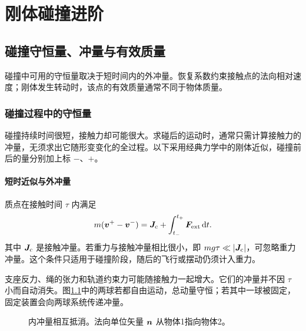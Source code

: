\chapter{刚体碰撞进阶}



\section{碰撞守恒量、冲量与有效质量}

碰撞中可用的守恒量取决于短时间内的外冲量。恢复系数约束接触点的法向相对速度；刚体发生转动时，该点的有效质量通常不同于物体质量。



\subsection{碰撞过程中的守恒量}
碰撞持续时间很短，接触力却可能很大。求碰后的运动时，通常只需计算接触力的冲量，无须求出它随形变变化的全过程。以下采用经典力学中的刚体近似，碰撞前后的量分别加上标 $-$、$+$。

\subsubsection{短时近似与外冲量}
质点在接触时间 $\tau$ 内满足
\begin{equation}
 m(\bm{v}^+-\bm{v}^-)=\bm{J}_{\rm c}+\int_{t_-}^{t_+}\bm{F}_{\rm ext}\mathop{}\!\mathrm d t.
\end{equation}
其中 $\bm{J}_{\rm c}$ 是接触冲量。若重力与接触冲量相比很小，即 $mg\tau\ll |\bm{J}_{\rm c}|$，可忽略重力冲量。这个条件只适用于碰撞阶段，随后的飞行或摆动仍须计入重力。

支座反力、绳的张力和轨道约束力可能随接触力一起增大。它们的冲量并不因 $\tau$ 小而自动消失。图\ref{sup5:fig:d4-t1}中的两球若都自由运动，总动量守恒；若其中一球被固定，固定装置会向两球系统传递冲量。

\begin{figure}[H]\centering
{}
\caption{内冲量相互抵消。法向单位矢量 $\bm{n}$ 从物体1指向物体2。}\label{sup5:fig:d4-t1}
\end{figure}

